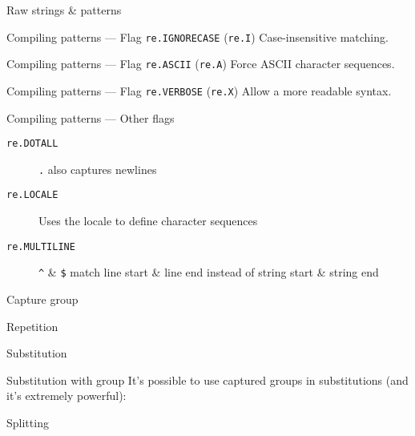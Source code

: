 \begin{frame}{Raw strings \& patterns}
\end{frame}

\begin{frame}{Compiling patterns --- Flag \texttt{re.IGNORECASE} (\texttt{re.I})}
  Case-insensitive matching.

\end{frame}

\begin{frame}{Compiling patterns --- Flag \texttt{re.ASCII} (\texttt{re.A})}
  Force ASCII character sequences.

\end{frame}

\begin{frame}{Compiling patterns --- Flag \texttt{re.VERBOSE} (\texttt{re.X})}
  Allow a more readable syntax.

\end{frame}

\begin{frame}{Compiling patterns --- Other flags}
  \begin{description}
  \item[\texttt{re.DOTALL}] \texttt{.} also captures newlines
  \item[\texttt{re.LOCALE}] Uses the locale to define character sequences
  \item[\texttt{re.MULTILINE}] \texttt{\^{}} \& \texttt{\$} match line start \& line end instead of string start \& string end
  \end{description}
\end{frame}

\begin{frame}{Capture group}
\end{frame}

\begin{frame}{Repetition}
\end{frame}

\begin{frame}{Substitution}
\end{frame}

\begin{frame}{Substitution with group}
  It's possible to use captured groups in substitutions (and it's extremely powerful):
\end{frame}

\begin{frame}{Splitting}
\end{frame}


